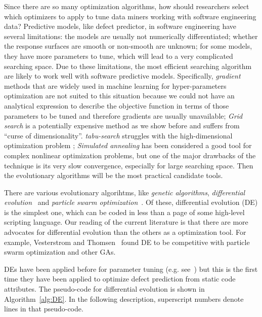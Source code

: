 Since there are so many optimization algorithms, how should researchers
select which optimizers to apply to tune data miners working 
with software engineering data? Predictive models, like defect predictor,
in software engineering have several limitations: the models are usually not
numerically differentiated; whether the response surfaces are smooth or non-smooth are unknown;
for some models, they have more parameters to tune, which will lead to a very complicated searching space. Due to these limitations, the most efficient searching algorithm
are likely to work well with software predictive models. Specifically,
{\em gradient} methods that are widely used in machine learning\cite{bengio2000gradient,maclaurin2015gradient} for 
hyper-parameters optimization are not suited to this situation because we could not have an analytical expression
to describe the objective function in terms of those parameters to be tuned and therefore gradients are usually unavailable; 
{\em Grid search} is a potentially expensive method as we show before\cite{tantithamthavorn2016automated} and suffers from ``curse of dimensionality''.
{\em tabu-search} struggles with
the high-dimensional optimization problem \cite{mayer1998tabu}; {\em Simulated annealing} 
has been considered a good tool for complex nonlinear optimization problems\cite{fea02a,me07f}, but one of the major drawbacks of the technique is its very slow convergence, especially for large searching space\cite{ram1996parallel}. Then the evolutionary algorithms will be
the most practical candidate tools.

There are various evolutionary algorihtms, like {\em genetic algorithms}\cite{goldberg79}, {\em differential evolution}~\cite{storn1997differential} and 
{\em particle swarm optimization}~\cite{pan08}.
Of these,   
differential evolution (DE) is the simplest one, which can be coded in less than a page of some high-level scripting language. Our reading of the current literature is that there are more  advocates for
differential evolution than
  the others as a optimization tool. For example,  Vesterstrom and Thomsen~\cite{Vesterstrom04} found DE to be competitive with 
  particle swarm optimization and other GAs. 
   
DEs have been applied before for   parameter tuning (e.g. see~\cite{omran2005differential, chiha2012tuning}) but this is the first time they have been applied to
optimize defect prediction from static code attributes.  
The pseudo-code for differential evolution is shown in Algorithm~\ref{alg:DE}.
In the following description, 
    superscript numbers denote lines in that pseudo-code.



